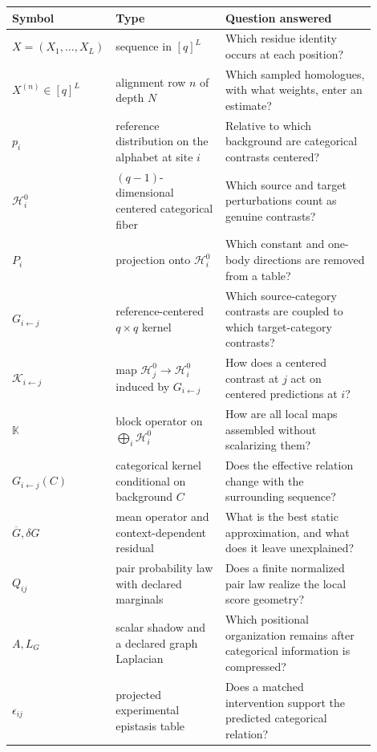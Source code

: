 \begin{center}
\small
\setlength{\tabcolsep}{4pt}
\begin{tabular}{@{}>{\raggedright\arraybackslash}p{0.16\linewidth}
                >{\raggedright\arraybackslash}p{0.31\linewidth}
                >{\raggedright\arraybackslash}p{0.43\linewidth}@{}}
\toprule
Symbol & Type & Question answered \\
\midrule
$X=(X_1,\ldots,X_L)$ & sequence in $[q]^L$ & Which residue identity occurs at each position? \\
$X^{(n)}\in[q]^L$ & alignment row $n$ of depth $N$ & Which sampled homologues, with what weights, enter an estimate? \\
$p_i$ & reference distribution on the alphabet at site $i$ & Relative to which background are categorical contrasts centered? \\
$\mathcal H_i^0$ & $(q-1)$-dimensional centered categorical fiber & Which source and target perturbations count as genuine contrasts? \\
$P_i$ & projection onto $\mathcal H_i^0$ & Which constant and one-body directions are removed from a table? \\
$G_{i\leftarrow j}$ & reference-centered $q\times q$ kernel & Which source-category contrasts are coupled to which target-category contrasts? \\
$\mathcal K_{i\leftarrow j}$ & map $\mathcal H_j^0\to\mathcal H_i^0$ induced by $G_{i\leftarrow j}$ & How does a centered contrast at $j$ act on centered predictions at $i$? \\
$\mathbb K$ & block operator on $\bigoplus_i\mathcal H_i^0$ & How are all local maps assembled without scalarizing them? \\
$G_{i\leftarrow j}(C)$ & categorical kernel conditional on background $C$ & Does the effective relation change with the surrounding sequence? \\
$\overline G,\delta G$ & mean operator and context-dependent residual & What is the best static approximation, and what does it leave unexplained? \\
$Q_{ij}$ & pair probability law with declared marginals & Does a finite normalized pair law realize the local score geometry? \\
$A,L_G$ & scalar shadow and a declared graph Laplacian & Which positional organization remains after categorical information is compressed? \\
$\epsilon_{ij}$ & projected experimental epistasis table & Does a matched intervention support the predicted categorical relation? \\
\bottomrule
\end{tabular}
\end{center}


